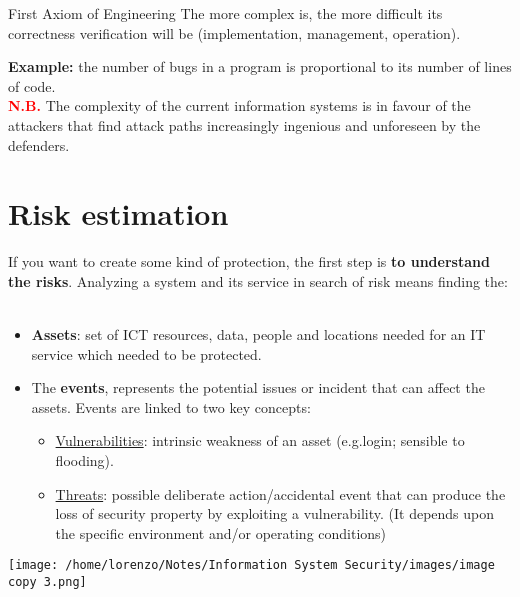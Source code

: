 \begin{quotebox-yellow}{First Axiom of Engineering}
    The more complex is, the more difficult its correctness verification will be (implementation, management, operation).
\end{quotebox-yellow}
\noindent
\textbf{Example:} the number of bugs in a program is proportional to its number of lines of code. 
\newline
\\ \textcolor{red}{\textbf{N.B.}} The complexity of the current information systems is in favour of the attackers that find attack paths increasingly ingenious and unforeseen by the defenders.

\newpage
\section{Risk estimation}
If you want to create some kind of protection, the first step is \textbf{to understand the risks}. Analyzing a system and its service in search of risk means finding the:
    \\
    \\
    \begin{minipage}{0.6\textwidth}
    \begin{itemize}
        \item \textbf{Assets}: set of ICT resources, data, people and locations needed for an IT service which needed to be protected.
        \item The \textbf{events}, represents the potential issues or incident that can affect the assets. Events are linked to two key concepts:
        \begin{itemize}
            \item \underline{Vulnerabilities}: intrinsic weakness of an asset (e.g.login; sensible to flooding).
            \item \underline{Threats}: possible deliberate action/accidental event that can produce the loss of security property by exploiting a vulnerability. (It depends upon the specific environment and/or operating conditions)
        \end{itemize} 
    \end{itemize}
    \end{minipage} 
    \hspace{0.2cm}
    \begin{minipage}{0.4\textwidth}
        \vspace{-1cm}
        \centering
        \texttt{[image: /home/lorenzo/Notes/Information System Security/images/image copy 3.png]}
    \end{minipage}
